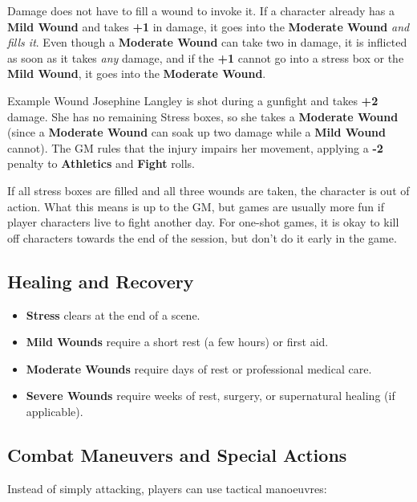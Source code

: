Damage does not have to fill a wound to invoke it. If a character already has a \textbf{Mild Wound} and takes \textbf{+1} in damage, it goes into the \textbf{Moderate Wound} \emph{and fills it}. Even though a \textbf{Moderate Wound} can take two in damage, it is inflicted as soon as it takes \emph{any} damage, and if the \textbf{+1} cannot go into a stress box or the \textbf{Mild Wound}, it goes into the \textbf{Moderate Wound}.

\begin{DndSidebar}[float=!t]{Example Wound}
Josephine Langley is shot during a gunfight and takes \textbf{+2} damage. She has no remaining Stress boxes, so she takes a \textbf{Moderate Wound} (since a \textbf{Moderate Wound} can soak up two damage while a \textbf{Mild Wound} cannot). The GM rules that the injury impairs her movement, applying a \textbf{-2} penalty to \textbf{Athletics} and \textbf{Fight} rolls.
\end{DndSidebar}

If all stress boxes are filled and all three wounds are taken, the character is out of action. What this means is up to the GM, but games are usually more fun if player characters live to fight another day. For one-shot games, it is okay to kill off characters towards the end of the session, but don't do it early in the game.

\subsection{Healing and Recovery}

\begin{itemize}
    \item \textbf{Stress} clears at the end of a scene.
    \item \textbf{Mild Wounds} require a short rest (a few hours) or first aid.
    \item \textbf{Moderate Wounds} require days of rest or professional medical care.
    \item \textbf{Severe Wounds} require weeks of rest, surgery, or supernatural healing (if applicable).
\end{itemize}

\subsection{Combat Maneuvers and Special Actions}
Instead of simply attacking, players can use tactical manoeuvres:

